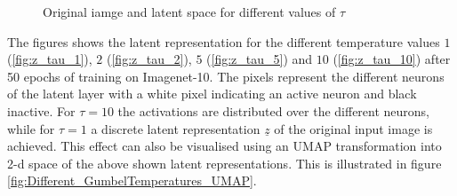 \documentclass[12pt,DIV14,BCOR12mm,a4paper,footexclude,headinclude,halfparskip-,twoside,openright,cleardoubleempty,idxtotoc,bibtotoc,listtotoc,abstracton]{scrreprt} %
\numberwithin{equation}{chapter}
\begin{document}
	\begin{figure}[htb!]
	\centering
	\qquad
	\qquad
	\qquad
	\qquad
	\qquad
	\caption{Original iamge and latent space for different values of $\tau$}
	\label{fig:Different_GumbelTemperatures}
\end{figure}
The figures shows the latent representation for the different temperature values $1$ (\ref{fig:z_tau_1}), $2$ (\ref{fig:z_tau_2}), $5$ (\ref{fig:z_tau_5}) and $10$ (\ref{fig:z_tau_10}) after 50 epochs of training on Imagenet-10. The pixels represent the different neurons of the latent layer with a white pixel indicating an active neuron and black inactive. For $\tau = 10$ the activations are distributed over the different neurons, while for $\tau = 1$ a discrete latent representation $\underline{z}$ of the original input image is achieved. This effect can also be visualised using an UMAP transformation into 2-d space of the above shown latent representations. This is illustrated in figure \ref{fig:Different_GumbelTemperatures_UMAP}.
\end{document}
